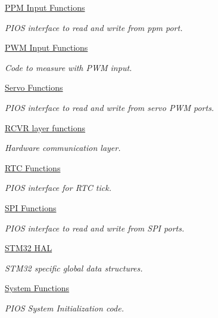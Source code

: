 \begin{DoxyCompactItemize}
\hyperlink{group___p_i_o_s___p_p_m}{P\-P\-M Input Functions}
\begin{DoxyCompactList}\small\item\em P\-I\-O\-S interface to read and write from ppm port. \end{DoxyCompactList}\item 
\hyperlink{group___p_i_o_s___p_w_m}{P\-W\-M Input Functions}
\begin{DoxyCompactList}\small\item\em Code to measure with P\-W\-M input. \end{DoxyCompactList}\item 
\hyperlink{group___p_i_o_s___s_e_r_v_o}{Servo Functions}
\begin{DoxyCompactList}\small\item\em P\-I\-O\-S interface to read and write from servo P\-W\-M ports. \end{DoxyCompactList}\item 
\hyperlink{group___p_i_o_s___r_c_v_r}{R\-C\-V\-R layer functions}
\begin{DoxyCompactList}\small\item\em Hardware communication layer. \end{DoxyCompactList}\item 
\hyperlink{group___p_i_o_s___r_t_c}{R\-T\-C Functions}
\begin{DoxyCompactList}\small\item\em P\-I\-O\-S interface for R\-T\-C tick. \end{DoxyCompactList}\item 
\hyperlink{group___p_i_o_s___s_p_i}{S\-P\-I Functions}
\begin{DoxyCompactList}\small\item\em P\-I\-O\-S interface to read and write from S\-P\-I ports. \end{DoxyCompactList}\item 
\hyperlink{group___p_i_o_s___s_t_m32}{S\-T\-M32 H\-A\-L}
\begin{DoxyCompactList}\small\item\em S\-T\-M32 specific global data structures. \end{DoxyCompactList}\item 
\hyperlink{group___p_i_o_s___s_y_s}{System Functions}
\begin{DoxyCompactList}\small\item\em P\-I\-O\-S System Initialization code. \end{DoxyCompactList}\item 

\end{DoxyCompactItemize}
